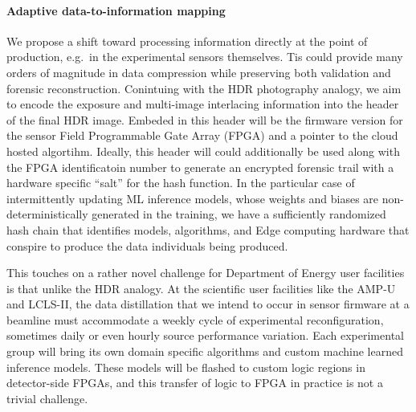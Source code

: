 \documentclass{article}
\begin{document}
\paragraph{Adaptive data-to-information mapping}
We propose a shift toward processing information directly at the point of production, e.g.~in the experimental sensors themselves.
Tis could provide many orders of magnitude in data compression while preserving both validation and forensic reconstruction.
Conintuing with the HDR photography analogy, we aim to encode the exposure and multi-image interlacing information into the header of the final HDR image.
Embeded in this header will be the firmware version for the sensor Field Programmable Gate Array (FPGA) and a pointer to the cloud hosted algortihm.
Ideally, this header will could additionally be used along with the FPGA identificatoin number to generate an encrypted forensic trail with a hardware specific ``salt'' for the hash function. 
In the particular case of intermittently updating ML inference models, whose weights and biases are non-deterministically generated in the training, we have a sufficiently randomized hash chain that identifies models, algorithms, and Edge computing hardware that conspire to produce the data individuals being produced.


This touches on a rather novel challenge for Department of Energy user facilities is that unlike the HDR analogy.
At the scientific user facilities like the AMP-U and LCLS-II, the data distillation that we intend to occur in sensor firmware at a beamline must accommodate a weekly cycle of experimental reconfiguration, sometimes daily or even hourly source performance variation.
Each experimental group will bring its own domain specific algorithms and custom machine learned inference models.
These models will be flashed to custom logic regions in detector-side FPGAs, and this transfer of logic to FPGA in practice is not a trivial challenge.
\end{document}
